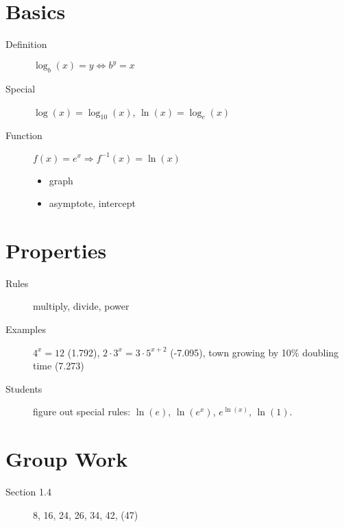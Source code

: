 \documentclass[11pt]{article}
\begin{document}
\drawtitle

\section*{Basics}
\begin{description}
\item[Definition] $\log_{b}(x)=y\Leftrightarrow b^y = x$
\item[Special] $\log(x)=\log_{10}(x)$, $\ln(x)=\log_e(x)$
\item[Function] $f(x)=e^x\Rightarrow f^{-1}(x)=\ln(x)$
  \begin{itemize}
  \item graph
  \item asymptote, intercept
  \end{itemize}
\end{description}

\section*{Properties}
\begin{description}
\item[Rules] multiply, divide, power
\item[Examples] $4^x=12$ (1.792), $2\cdot 3^x =3\cdot 5^{x+2}$
  (-7.095), town growing by 10\% doubling time (7.273)
\item[Students] figure out special rules: $\ln(e)$, $\ln(e^x)$,
  $e^{\ln(x)}$, $\ln(1)$.
\end{description}

\section*{Group Work}
\begin{description}
\item[Section 1.4] 8, 16, 24, 26, 34, 42, (47)
\end{description}
\end{document}
